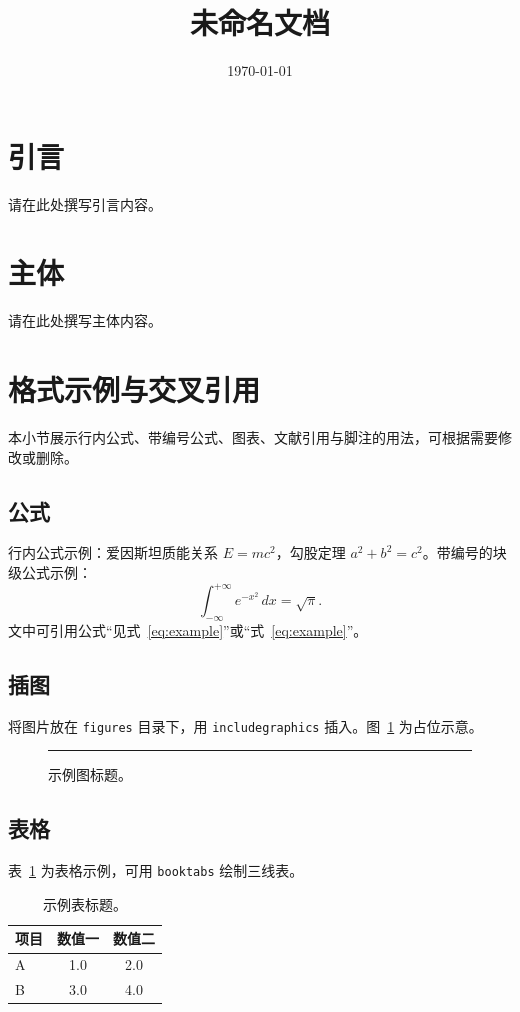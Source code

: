 \documentclass{article}
\title{未命名文档}
\author{}
\date{\today}
\begin{document}
\maketitle

\section{引言}
请在此处撰写引言内容。

\section{主体}
请在此处撰写主体内容。

\section{格式示例与交叉引用}
本小节展示行内公式、带编号公式、图表、文献引用与脚注的用法，可根据需要修改或删除。

\subsection{公式}
行内公式示例：爱因斯坦质能关系 $E=mc^2$，勾股定理 \( a^2 + b^2 = c^2 \)。带编号的块级公式示例：
\begin{equation}
  \label{eq:example}
  \int_{-\infty}^{+\infty} e^{-x^2} \, dx = \sqrt{\pi}.
\end{equation}
文中可引用公式“见式~\eqref{eq:example}”或“式~\ref{eq:example}”。

\subsection{插图}
将图片放在 \texttt{figures} 目录下，用 \texttt{includegraphics} 插入。图~\ref{fig:example} 为占位示意。
\begin{figure}[htbp]
  \centering
  \rule{4cm}{2.5cm}  %
  \caption{示例图标题。}
  \label{fig:example}
\end{figure}

\subsection{表格}
表~\ref{tab:example} 为表格示例，可用 \texttt{booktabs} 绘制三线表。
\begin{table}[htbp]
  \centering
  \caption{示例表标题。}
  \label{tab:example}
  \begin{tabular}{lcc}
    \toprule
    项目 & 数值一 & 数值二 \\
    \midrule
    A    & 1.0   & 2.0   \\
    B    & 3.0   & 4.0   \\
    \bottomrule
  \end{tabular}
\end{table}
\end{document}
